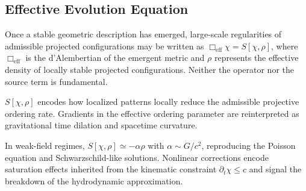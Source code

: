\subsection{Effective Evolution Equation}
  \label{subsec:effective-evolution-equation}

  Once a stable geometric description has emerged, large-scale
  regularities of admissible projected configurations may be written as
  $\Box_{\mathrm{eff}}\chi = S[\chi,\rho]$,
  where $\Box_{\mathrm{eff}}$ is the d'Alembertian of the emergent
  metric and $\rho$ represents the effective density of locally stable
  projected configurations.
  Neither the operator nor the source term is fundamental.

  $S[\chi,\rho]$ encodes how localized patterns locally reduce the
  admissible projective ordering rate.
  Gradients in the effective ordering parameter are reinterpreted as
  gravitational time dilation and spacetime curvature.

  In weak-field regimes,
  $S[\chi,\rho] \simeq -\alpha\rho$ with
  $\alpha \sim G/c^2$, reproducing the Poisson equation and
  Schwarzschild-like solutions.
  Nonlinear corrections encode saturation effects inherited from the
  kinematic constraint $\partial_t\chi \le c$ and signal the breakdown
  of the hydrodynamic approximation.
